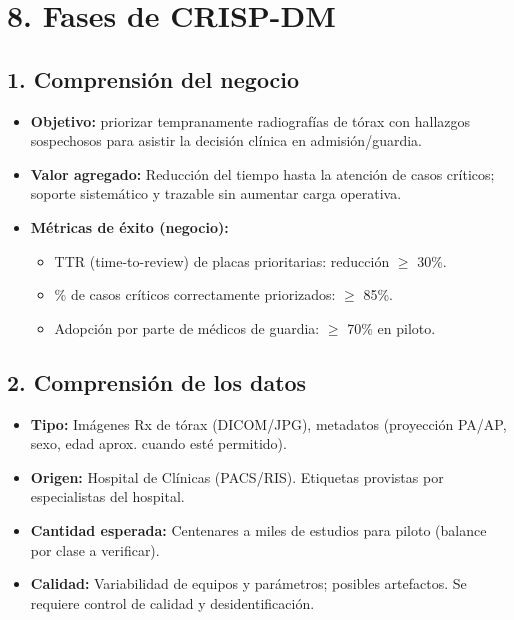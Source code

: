 \documentclass[
11pt, %
]{charter}
\begin{document}
\section{8. Fases de CRISP-DM}

\subsection*{1. Comprensión del negocio}
\begin{itemize}
  \item \textbf{Objetivo:} priorizar tempranamente radiografías de tórax con hallazgos sospechosos para asistir la decisión clínica en admisión/guardia.
  \item \textbf{Valor agregado:} Reducción del tiempo hasta la atención de casos críticos; soporte sistemático y trazable sin aumentar carga operativa.
  \item \textbf{Métricas de éxito (negocio):} 
    \begin{itemize}
      \item TTR (time-to-review) de placas prioritarias: reducción \(\geq\) 30\%.
      \item \% de casos críticos correctamente priorizados: \(\geq\) 85\%.
      \item Adopción por parte de médicos de guardia: \(\geq\) 70\% en piloto.
    \end{itemize}
\end{itemize}

\subsection*{2. Comprensión de los datos}
\begin{itemize}
  \item \textbf{Tipo:} Imágenes Rx de tórax (DICOM/JPG), metadatos (proyección PA/AP, sexo, edad aprox. cuando esté permitido).
  \item \textbf{Origen:} Hospital de Clínicas (PACS/RIS). Etiquetas provistas por especialistas del hospital.
  \item \textbf{Cantidad esperada:} Centenares a miles de estudios para piloto (balance por clase a verificar).
  \item \textbf{Calidad:} Variabilidad de equipos y parámetros; posibles artefactos. Se requiere control de calidad y desidentificación.
\end{itemize}
\end{document}
